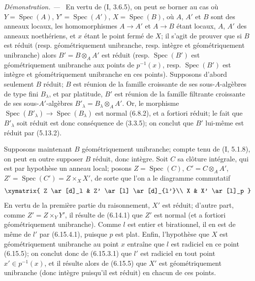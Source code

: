 \documentclass[10pt,oneside]{book}
\newenvironment{proof}{%
  \par\medskip\noindent\textit{Démonstration. ---\ }}{\par}
\begin{document}
\begin{proof}
En vertu de (I, 3.6.5), on peut se borner au cas où
$Y=\operatorname{Spec}(A)$, $Y'=\operatorname{Spec}(A')$,
$X=\operatorname{Spec}(B)$, où $A$, $A'$ et $B$ sont des anneaux locaux,
les homomorphismes $A\to A'$ et $A\to B$ étant locaux, $A$, $A'$ des
anneaux noethériens, et $x$ étant le point fermé de $X$; il s'agit de
prouver que si $B$ est réduit (resp. géométriquement unibranche, resp.
intègre et géométriquement unibranche) alors $B'=B\otimes_A A'$ est réduit
(resp. $\operatorname{Spec}(B')$ est géométriquement unibranche aux points
de $p^{-1}(x)$, resp. $\operatorname{Spec}(B')$ est intègre et
géométriquement unibranche en ces points). Supposons d'abord seulement
$B$ réduit; $B$ est réunion de la famille croissante de ses
sous-$A$-algèbres de type fini $B_\lambda$, et par platitude, $B'$ est
réunion de la famille filtrante croissante de ses sous-$A'$-algèbres
$B'_\lambda=B_\lambda\otimes_A A'$. Or, le morphisme
$\operatorname{Spec}(B'_\lambda)\to\operatorname{Spec}(B_\lambda)$ est
normal (6.8.2), et a fortiori réduit; le fait que $B'_\lambda$ soit réduit
est donc conséquence de (3.3.5); on conclut que $B'$ lui-même est réduit par
(5.13.2).

Supposons maintenant $B$ géométriquement unibranche; compte tenu de (I,
5.1.8), on peut en outre supposer $B$ réduit, donc intègre. Soit $C$ sa
clôture intégrale, qui est par hypothèse un anneau local; posons
$Z=\operatorname{Spec}(C)$, $C'=C\otimes_A A'$,
$Z'=\operatorname{Spec}(C')=Z\times_X X'$, de sorte que l'on a le diagramme
commutatif
\[
\xymatrix{
Z \ar[d]_l & Z' \ar[l] \ar[d]_{l'}\\
X & X' \ar[l]_p
}
\]
En vertu de la première partie du raisonnement, $X'$ est réduit; d'autre
part, comme $Z'=Z\times_Y Y'$, il résulte de (6.14.1) que $Z'$ est normal
(et a fortiori géométriquement unibranche). Comme $l$ est entier et
birationnel, il en est de même de $l'$ par (6.15.4.1), puisque $p$ est
plat. Enfin, l'hypothèse que $X$ est géométriquement unibranche au point
$x$ entraîne que $l$ est radiciel en ce point (6.15.5); on conclut donc de
(6.15.3.1) que $l'$ est radiciel en tout point $x'\in p^{-1}(x)$, et il
résulte alors de (6.15.5) que $X'$ est géométriquement unibranche (donc
intègre puisqu'il est réduit) en chacun de ces points.
\end{proof}
\end{document}
